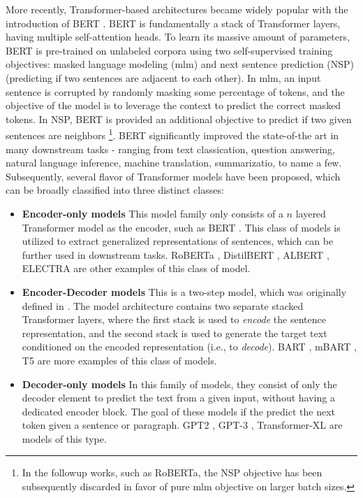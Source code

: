 \documentclass[letterpaper, 12pt]{report}
\begin{document}
More recently, Transformer-based architectures became widely popular with the introduction of BERT \citep{devlin2018bert}. BERT is fundamentally a stack of Transformer layers, having multiple self-attention heads. To learn its massive amount of parameters, BERT is pre-trained on unlabeled corpora using two self-supervised training objectives: masked language modeling (\acrshort{mlm}) and next sentence prediction (NSP) (predicting if two sentences are adjacent to each other). In \acrshort{mlm}, an input sentence is corrupted by randomly masking some percentage of tokens, and the objective of the model is to leverage the context to predict the correct masked tokens. In NSP, BERT is provided an additional objective to predict if two given sentences are neighbors \footnote{In the followup works, such as RoBERTa, the NSP objective has been subsequently discarded in favor of pure \acrshort{mlm} objective on larger batch sizes.}. BERT significantly improved the state-of-the art in many downstream tasks - ranging from text classication, question answering, natural language inference, machine translation, summarizatio, to name a few. Subsequently, several flavor of Transformer models have been proposed, which can be broadly classified into three distinct classes:

\begin{itemize}
  \item \textbf{Encoder-only models} This model family only consists of a $n$ layered Transformer model as the encoder, such as BERT \citep{devlin2018bert}. This class of models is utilized to extract generalized representations of sentences, which can be further used in downstream tasks. RoBERTa \citep{liu-et-al-2019-roberta}, DistilBERT \citep{sanh2020distilbert}, ALBERT \citep{lan2019albert}, ELECTRA \citep{clark2020electra} are other examples of this class of model.
  \item \textbf{Encoder-Decoder models} This is a two-step model, which was originally defined in \cite{vaswani2017}. The model architecture contains two separate stacked Transformer layers, where the first stack is used to \textit{encode} the sentence representation, and the second stack is used to generate the target text conditioned on the encoded representation (i.e., to \textit{decode}). BART \citep{lewis-etal-2020-bart}, mBART \citep{liu2020multilingual}, T5 \citep{Raffel2020:T5} are more examples of this class of models.
  \item \textbf{Decoder-only models} In this family of models, they consist of only the decoder element to predict the text from a given input, without having a dedicated encoder block. The goal of these models if the predict the next token given a sentence or paragraph. GPT2 \citep{Radford2019:GPT2}, GPT-3 \citep{Brown2020:GPT3}, Transformer-XL \cite{dai-etal-2019-transformer} are models of this type.
\end{itemize}
\end{document}
